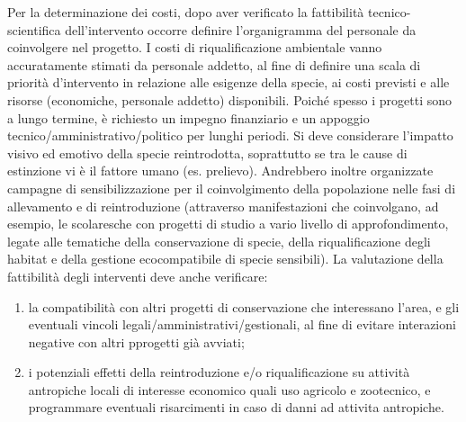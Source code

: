 \documentclass[11pt,a4paper,italian,twoside,openany]{memoir}
\begin{document}
Per la determinazione dei costi, dopo aver verificato la fattibilità tecnico-scientifica dell'intervento occorre definire l'organigramma del personale da coinvolgere nel progetto. I costi di riqualificazione ambientale vanno accuratamente stimati da personale addetto, al fine di definire una scala di priorità d'intervento in relazione alle esigenze della specie, ai costi previsti e alle risorse (economiche, personale addetto) disponibili. Poiché spesso i progetti sono a lungo termine, è richiesto un impegno finanziario e un appoggio tecnico/amministrativo/politico per lunghi periodi. Si deve considerare l'impatto visivo ed emotivo della specie reintrodotta, soprattutto se tra le cause di estinzione vi è il fattore umano (es. prelievo). Andrebbero inoltre organizzate campagne di sensibilizzazione per il coinvolgimento della popolazione nelle fasi di allevamento e di reintroduzione (attraverso manifestazioni che coinvolgano, ad esempio, le scolaresche con progetti di studio a vario livello di approfondimento, legate alle tematiche della conservazione di specie, della riqualificazione degli habitat e della gestione ecocompatibile di specie sensibili).
La valutazione della fattibilità degli interventi deve anche verificare:
\begin{enumerate}[label={\arabic*)}]
  \item la compatibilità con altri progetti di conservazione che interessano l'area, e gli eventuali vincoli legali/amministrativi/gestionali, al fine di evitare interazioni negative con altri pprogetti già avviati;
  \item i potenziali effetti della reintroduzione e/o riqualificazione su attività antropiche locali di interesse economico quali uso agricolo e zootecnico, e programmare eventuali risarcimenti in caso di danni ad attivita antropiche.
\end{enumerate}
\end{document}
